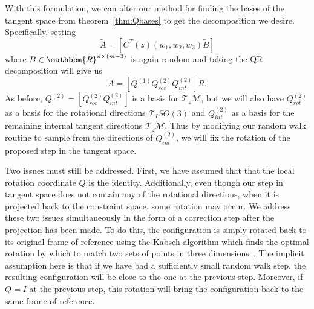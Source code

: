 With this formulation, we can alter our method for finding the bases of the tangent space from theorem~\ref{thm:Qbases} to get the decomposition we desire. Specifically, setting 
$$\tilde{A} = \left[C^T(z) (w_1, w_2, w_3) \tilde{B} \right]$$
where $B \in \mathbbm{R}^{n\times (m-3)}$ is again random and taking the QR decomposition will give us 
$$\tilde{A} = \left[Q^{(1)} Q^{(2)}_{rot} Q^{(2)}_{int}\right]R.$$
As before, $Q^{(2)} = \left[Q^{(2)}_{rot} Q^{(2)}_{int} \right]$ is a basis for $\mathcal{T}_z\mathcal{M}$, but we will also have $Q^{(2)}_{rot}$ as a basis for the rotational directions $\mathcal{T}_ISO(3)$ and $Q^{(2)}_{int}$ as a basis for the remaining internal tangent directions $\mathcal{T}_{\tilde{z}}\tilde{\mathcal{M}}$. Thus by modifying our 
random walk routine to sample from the directions of $Q_{int}^{(2)}$, we will fix the rotation of the proposed step in the tangent space.

Two issues must still be addressed. First, we have assumed that that the local rotation coordinate $Q$ is the identity. Additionally, even though our step in tangent space does not contain any of the rotational directions, when it is projected back to the constraint space, some rotation may occur. We address these two issues simultaneously in the form of a correction step after the projection has been made. To do this, the configuration is simply rotated back to its original frame of reference using the Kabsch algorithm which finds the optimal rotation by which to match two sets of points in three dimensions~\cite{Kabsch}. The implicit assumption here is that if we have bad a sufficiently small random walk step, the resulting configuration will be close to the one at the previous step. Moreover, if $Q=I$ at the previous step, this rotation will bring the configuration back to the same frame of reference. 

